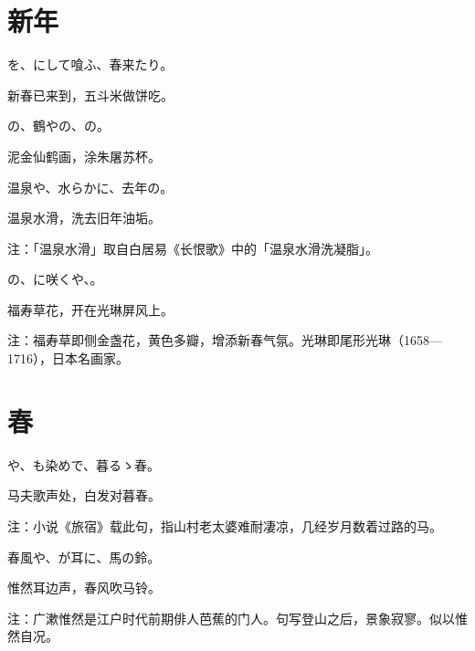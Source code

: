 \newpage

\section{\FK 新年}

\setcounter{haikucounter}{0}

\begin{haiku}
    {\FH {}を、にして喰ふ、春来たり。}

    {\FK 新春已来到，五斗米做饼吃。}
\end{haiku}

\begin{haiku}
    {\FH {}の、鶴やの、の。}

    {\FK 泥金仙鹤画，涂朱屠苏杯。}
\end{haiku}

\begin{haiku}
    {\FH 温泉や、水らかに、去年の。}

    {\FK 温泉水滑，洗去旧年油垢。}

    {\FT 注：「温泉水滑」取自白居易《长恨歌》中的「温泉水滑洗凝脂」。}
\end{haiku}

\begin{haiku}
    {\FH {}の、に咲くや、。}

    {\FK 福寿草花，开在光琳屏风上。}

    {\FT 注：福寿草即侧金盏花，黄色多瓣，增添新春气氛。光琳即尾形光琳（1658—1716），日本名画家。}
\end{haiku}

\section{\FK 春}

\setcounter{haikucounter}{0}

\begin{haiku}
    {\FH {}や、も染めで、暮るゝ春。}

    {\FK 马夫歌声处，白发对暮春。}

    {\FT 注：小说《旅宿》载此句，指山村老太婆难耐凄凉，几经岁月数着过路的马。}
\end{haiku}

\begin{haiku}
    {\FH 春風や、が耳に、馬の鈴。}

    {\FK 惟然耳边声，春风吹马铃。}

    {\FT 注：广漱惟然是江户时代前期俳人芭蕉的门人。句写登山之后，景象寂寥。似以惟然自况。}
\end{haiku}

